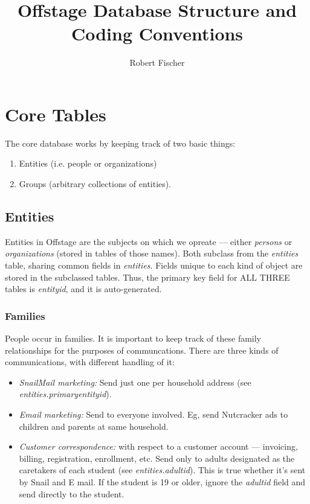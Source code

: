 \documentclass[11pt]{article}
\title{Offstage Database Structure and Coding Conventions}
\author{Robert Fischer}
\begin{document}
\maketitle

\section{Core Tables}

The core database works by keeping track of two basic things:

\begin{enumerate}
\item Entities (i.e. people or organizations)
\item Groups (arbitrary collections of entities).
\end{enumerate}

\subsection{Entities}

Entities in Offstage are the subjects on which we opreate --- either \emph{persons} or \emph{organizations} (stored in tables of those names).  Both subclass from the \emph{entities} table, sharing common fields in \emph{entities}.  Fields unique to each kind of object are stored in the subclassed tables.  Thus, the primary key field for ALL THREE tables is \emph{entityid}, and it is auto-generated.

\subsubsection{Families}

People occur in families.  It is important to keep track of these family relationships for the purposes of communcations.  There are three kinds of communications, with different handling of it:

 \begin{itemize}
 \item \emph{SnailMail marketing:} Send just one per household address (see \emph{entities.primaryentityid}).
 \item \emph{Email marketing:} Send to everyone involved.  Eg, send Nutcracker ads to children and parents at same household.
 \item \emph{Customer correspondence:} with respect to a customer account --- invoicing, billing, registration, enrollment, etc.  Send only to adults designated as the caretakers of each student (see \emph{entities.adultid}).  This is true whether it's sent by Snail and E mail.  If the student is 19 or older, ignore the \emph{adultid} field and send directly to the student.
 \end{itemize}
\end{document}
